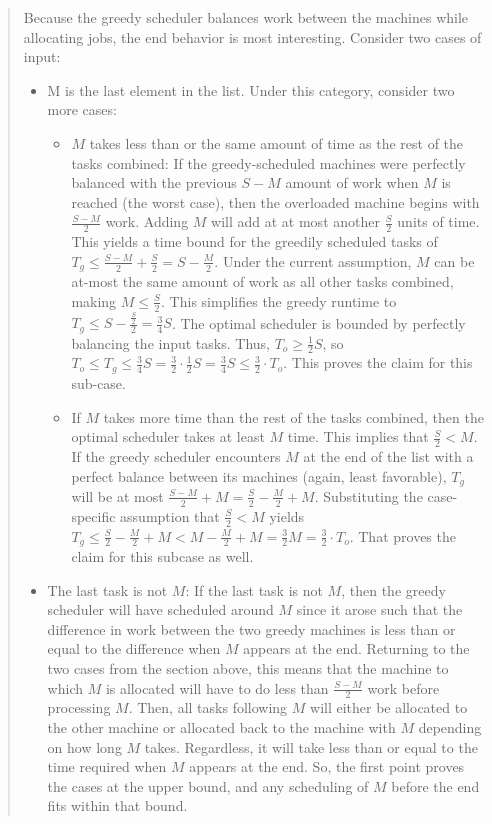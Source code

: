 \documentclass[11pt]{article}
\begin{document}
\begin{enumerate}
\begin{enumerate}
\begin{quote}
\medskip
Because the greedy scheduler balances work between the machines while allocating jobs, the end behavior is most interesting. Consider two cases of input:
\begin{itemize}
  \item M is the last element in the list. Under this category, consider two more cases: 
  \begin{itemize}
    \item $M$ takes less than or the same amount of time as the rest of the tasks combined: If the greedy-scheduled machines were perfectly balanced with the previous $S - M$ amount of work when $M$ is reached (the worst case), then the overloaded machine begins with $\frac{S - M}{2}$ work. Adding $M$ will add at at most another $\frac{S}{2}$ units of time. This yields a time bound for the greedily scheduled tasks of $T_g \leq \frac{S - M}{2} + \frac{S}{2} = S - \frac{M}{2}$. Under the current assumption, $M$ can be at-most the same amount of work as all other tasks combined, making $M \leq \frac{S}{2}$. This simplifies the greedy runtime to $T_g \leq S - \frac{\frac{S}{2}}{2} = \frac{3}{4}S$. The optimal scheduler is bounded by perfectly balancing the input tasks. Thus, $T_o \geq \frac{1}{2}S$, so $T_o \leq T_g \leq \frac{3}{4}S = \frac{3}{2} \cdot \frac{1}{2}S = \frac{3}{4}S \leq \frac{3}{2} \cdot T_o$. This proves the claim for this sub-case.
    \item If $M$ takes more time than the rest of the tasks combined, then the optimal scheduler takes at least $M$ time. This implies that $\frac{S}{2} < M$. If the greedy scheduler encounters $M$ at the end of the list with a perfect balance between its machines (again, least favorable), $T_g$ will be at most $\frac{S - M}{2} + M = \frac{S}{2} - \frac{M}{2} + M$. Substituting the case-specific assumption that $\frac{S}{2} < M$ yields $T_g \leq \frac{S}{2} - \frac{M}{2} + M < M - \frac{M}{2} + M = \frac{3}{2}M = \frac{3}{2} \cdot T_o$. That proves the claim for this subcase as well. 
  \end{itemize}
\item The last task is not $M$: If the last task is not $M$, then the greedy scheduler will have scheduled around $M$ since it arose such that the difference in work between the two greedy machines is less than or equal to the difference when $M$ appears at the end. Returning to the two cases from the section above, this means that the machine to which $M$ is allocated will have to do less than $\frac{S - M}{2}$ work before processing $M$. Then, all tasks following $M$ will either be allocated to the other machine or allocated back to the machine with $M$ depending on how long $M$ takes. Regardless, it will take less than or equal to the time required when $M$ appears at the end. So, the first point proves the cases at the upper bound, and any scheduling of $M$ before the end fits within that bound. 

\end{itemize}
\end{quote}
\end{enumerate}
\end{enumerate}
\end{document}
